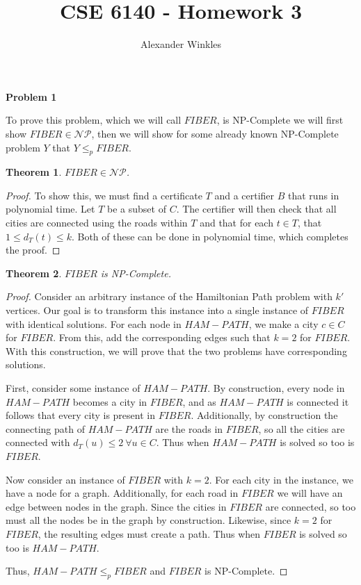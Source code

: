\documentclass{article}
\title{CSE 6140 - Homework 3}
\author{Alexander Winkles}
\date{}
\newcommand{\Problem}[1]{\textbf{\large Problem #1}}
\begin{document}
\maketitle

\vspace{2in}



\newpage

\Problem{1}

To prove this problem, which we will call $FIBER$, is NP-Complete we will first show $FIBER \in \mathcal{NP}$, then we will show for some already known NP-Complete problem $Y$ that $Y \leq_p FIBER$. 

\newtheorem{np}{Theorem}
\begin{np}
$FIBER \in \mathcal{NP}$.
\end{np}
\begin{proof} %
To show this, we must find a certificate $T$ and a certifier $B$ that runs in polynomial time. 
Let $T$ be a subset of $C$.
The certifier will then check that all cities are connected using the roads within $T$ and that for each $t \in T$, that $1 \leq d_T(t) \leq k$. 
Both of these can be done in polynomial time, which completes the proof. 
\end{proof}

\begin{np}
$FIBER$ is NP-Complete. 	
\end{np}
\begin{proof}

Consider an arbitrary instance of the Hamiltonian Path problem with $k'$ vertices. 
Our goal is to transform this instance into a single instance of $FIBER$ with identical solutions.
For each node in $HAM-PATH$, we make a city $c \in C$ for $FIBER$.
From this, add the corresponding edges such that $k = 2$ for $FIBER$. 
With this construction, we will prove that the two problems have corresponding solutions.

First, consider some instance of $HAM-PATH$.
By construction, every node in $HAM-PATH$ becomes a city in $FIBER$, and as $HAM-PATH$ is connected it follows that every city is present in $FIBER$. 
Additionally, by construction the connecting path of $HAM-PATH$ are the roads in $FIBER$, so all the cities are connected with $d_T(u) \leq 2\ \forall u \in C$. 
Thus when $HAM-PATH$ is solved so too is $FIBER$.

Now consider an instance of $FIBER$ with $k = 2$. 
For each city in the instance, we have a node for a graph.
Additionally, for each road in $FIBER$ we will have an edge between nodes in the graph. 
Since the cities in $FIBER$ are connected, so too must all the nodes be in the graph by construction.
Likewise, since $k = 2$ for $FIBER$, the resulting edges must create a path.
Thus when $FIBER$ is solved so too is $HAM-PATH$. 

Thus, $HAM-PATH\leq_p FIBER$ and $FIBER$ is NP-Complete. 
\end{proof}
\end{document}
